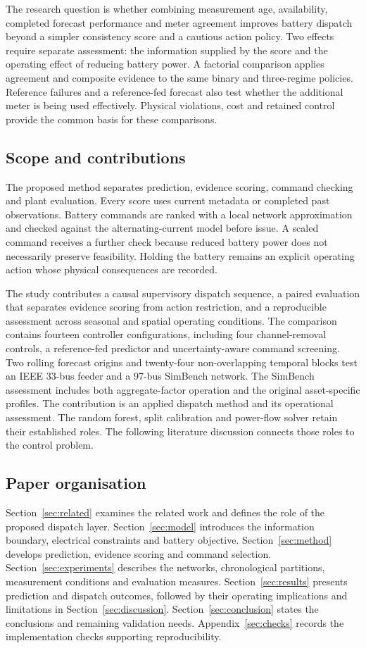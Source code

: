 \documentclass[preprint,12pt]{elsarticle}
\begin{document}
The research question is whether combining measurement age, availability, completed forecast performance and meter agreement improves battery dispatch beyond a simpler consistency score and a cautious action policy. Two effects require separate assessment: the information supplied by the score and the operating effect of reducing battery power. A factorial comparison applies agreement and composite evidence to the same binary and three-regime policies. Reference failures and a reference-fed forecast also test whether the additional meter is being used effectively. Physical violations, cost and retained control provide the common basis for these comparisons.

\subsection{Scope and contributions}
The proposed method separates prediction, evidence scoring, command checking and plant evaluation. Every score uses current metadata or completed past observations. Battery commands are ranked with a local network approximation and checked against the alternating-current model before issue. A scaled command receives a further check because reduced battery power does not necessarily preserve feasibility. Holding the battery remains an explicit operating action whose physical consequences are recorded.

The study contributes a causal supervisory dispatch sequence, a paired evaluation that separates evidence scoring from action restriction, and a reproducible assessment across seasonal and spatial operating conditions. The comparison contains fourteen controller configurations, including four channel-removal controls, a reference-fed predictor and uncertainty-aware command screening. Two rolling forecast origins and twenty-four non-overlapping temporal blocks test an IEEE 33-bus feeder and a 97-bus SimBench network. The SimBench assessment includes both aggregate-factor operation and the original asset-specific profiles. The contribution is an applied dispatch method and its operational assessment. The random forest, split calibration and power-flow solver retain their established roles. The following literature discussion connects those roles to the control problem.

\subsection{Paper organisation}
Section~\ref{sec:related} examines the related work and defines the role of the proposed dispatch layer. Section~\ref{sec:model} introduces the information boundary, electrical constraints and battery objective. Section~\ref{sec:method} develops prediction, evidence scoring and command selection. Section~\ref{sec:experiments} describes the networks, chronological partitions, measurement conditions and evaluation measures. Section~\ref{sec:results} presents prediction and dispatch outcomes, followed by their operating implications and limitations in Section~\ref{sec:discussion}. Section~\ref{sec:conclusion} states the conclusions and remaining validation needs. Appendix~\ref{sec:checks} records the implementation checks supporting reproducibility.
\end{document}
